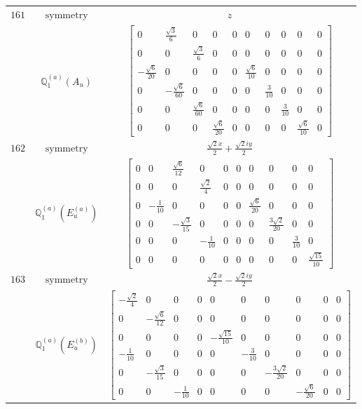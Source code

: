 \documentclass[fleqn,8pt,landscape]{jsarticle}
\begin{document}
\begin{longtable}{ccc}
$ 161 $ & $ \text{symmetry} $ & $ z $ \\
$  $ & $ \mathbb{Q}_{1}^{(a)}(A_{u}) $ & $ \begin{bmatrix} 0 & \frac{\sqrt{3}}{6} & 0 & 0 & 0 & 0 & 0 & 0 & 0 & 0 \\ 0 & 0 & \frac{\sqrt{3}}{6} & 0 & 0 & 0 & 0 & 0 & 0 & 0 \\ - \frac{\sqrt{6}}{20} & 0 & 0 & 0 & 0 & \frac{\sqrt{6}}{10} & 0 & 0 & 0 & 0 \\ 0 & - \frac{\sqrt{6}}{60} & 0 & 0 & 0 & 0 & \frac{3}{10} & 0 & 0 & 0 \\ 0 & 0 & \frac{\sqrt{6}}{60} & 0 & 0 & 0 & 0 & \frac{3}{10} & 0 & 0 \\ 0 & 0 & 0 & \frac{\sqrt{6}}{20} & 0 & 0 & 0 & 0 & \frac{\sqrt{6}}{10} & 0 \end{bmatrix} $ \\ \hline
$ 162 $ & $ \text{symmetry} $ & $ \frac{\sqrt{2} x}{2} + \frac{\sqrt{2} i y}{2} $ \\
$  $ & $ \mathbb{Q}_{1}^{(a)}(E_{u}^{(a)}) $ & $ \begin{bmatrix} 0 & 0 & \frac{\sqrt{6}}{12} & 0 & 0 & 0 & 0 & 0 & 0 & 0 \\ 0 & 0 & 0 & \frac{\sqrt{2}}{4} & 0 & 0 & 0 & 0 & 0 & 0 \\ 0 & - \frac{1}{10} & 0 & 0 & 0 & 0 & \frac{\sqrt{6}}{20} & 0 & 0 & 0 \\ 0 & 0 & - \frac{\sqrt{3}}{15} & 0 & 0 & 0 & 0 & \frac{3 \sqrt{2}}{20} & 0 & 0 \\ 0 & 0 & 0 & - \frac{1}{10} & 0 & 0 & 0 & 0 & \frac{3}{10} & 0 \\ 0 & 0 & 0 & 0 & 0 & 0 & 0 & 0 & 0 & \frac{\sqrt{15}}{10} \end{bmatrix} $ \\ \hline
$ 163 $ & $ \text{symmetry} $ & $ \frac{\sqrt{2} x}{2} - \frac{\sqrt{2} i y}{2} $ \\
$  $ & $ \mathbb{Q}_{1}^{(a)}(E_{u}^{(b)}) $ & $ \begin{bmatrix} - \frac{\sqrt{2}}{4} & 0 & 0 & 0 & 0 & 0 & 0 & 0 & 0 & 0 \\ 0 & - \frac{\sqrt{6}}{12} & 0 & 0 & 0 & 0 & 0 & 0 & 0 & 0 \\ 0 & 0 & 0 & 0 & - \frac{\sqrt{15}}{10} & 0 & 0 & 0 & 0 & 0 \\ - \frac{1}{10} & 0 & 0 & 0 & 0 & - \frac{3}{10} & 0 & 0 & 0 & 0 \\ 0 & - \frac{\sqrt{3}}{15} & 0 & 0 & 0 & 0 & - \frac{3 \sqrt{2}}{20} & 0 & 0 & 0 \\ 0 & 0 & - \frac{1}{10} & 0 & 0 & 0 & 0 & - \frac{\sqrt{6}}{20} & 0 & 0 \end{bmatrix} $ \\ \hline

\end{longtable}
\end{document}
